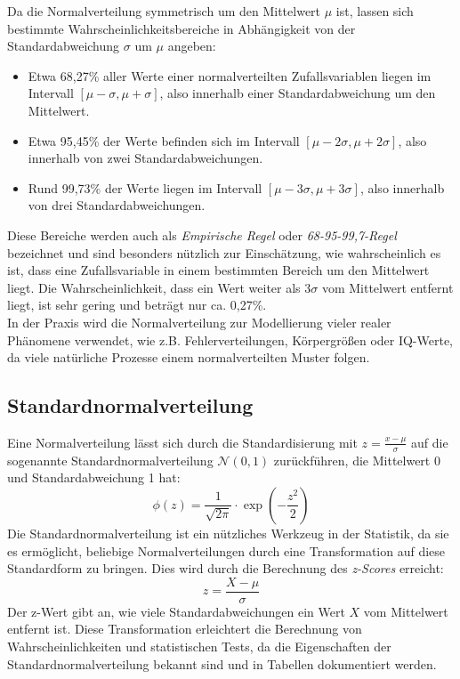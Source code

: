 Da die Normalverteilung symmetrisch um den Mittelwert $\mu$ ist, lassen sich bestimmte Wahrscheinlichkeitsbereiche in Abhängigkeit von der Standardabweichung $\sigma$ um $\mu$ angeben:

\begin{itemize}
    \item Etwa 68,27\% aller Werte einer normalverteilten Zufallsvariablen liegen im Intervall $[\mu - \sigma, \mu + \sigma]$, also innerhalb einer Standardabweichung um den Mittelwert.
    \item Etwa 95,45\% der Werte befinden sich im Intervall $[\mu - 2\sigma, \mu + 2\sigma]$, also innerhalb von zwei Standardabweichungen.
    \item Rund 99,73\% der Werte liegen im Intervall $[\mu - 3\sigma, \mu + 3\sigma]$, also innerhalb von drei Standardabweichungen.
\end{itemize}
Diese Bereiche werden auch als \textit{Empirische Regel} oder \textit{68-95-99,7-Regel} bezeichnet und sind besonders nützlich zur Einschätzung, wie wahrscheinlich es ist, dass eine Zufallsvariable in einem bestimmten Bereich um den Mittelwert liegt. Die Wahrscheinlichkeit, dass ein Wert weiter als $3\sigma$ vom Mittelwert entfernt liegt, ist sehr gering und beträgt nur ca. 0,27\%. \\
In der Praxis wird die Normalverteilung zur Modellierung vieler realer Phänomene verwendet, wie z.B. Fehlerverteilungen, Körpergrößen oder IQ-Werte, da viele natürliche
Prozesse einem normalverteilten Muster folgen.


\subsection{Standardnormalverteilung}
\label{sec:standard_normal_distribution}

Eine Normalverteilung lässt sich durch die Standardisierung mit $z = \frac{x - \mu}{\sigma}$ auf die sogenannte Standardnormalverteilung $\mathcal{N}(0, 1)$ zurückführen, die Mittelwert 0 und Standardabweichung 1 hat:
\[
\phi(z) = \frac{1}{\sqrt{2 \pi}} \cdot \exp\left(-\frac{z^2}{2}\right)
\]
Die Standardnormalverteilung ist ein nützliches Werkzeug in der Statistik, da sie es ermöglicht, beliebige Normalverteilungen durch eine Transformation auf diese Standardform zu bringen. Dies wird durch die Berechnung des \textit{z-Scores} erreicht:
\[
z = \frac{X - \mu}{\sigma}
\]
Der z-Wert gibt an, wie viele Standardabweichungen ein Wert \(X\) vom Mittelwert entfernt ist. Diese Transformation erleichtert die Berechnung von Wahrscheinlichkeiten und statistischen Tests, da die Eigenschaften der Standardnormalverteilung bekannt sind und in Tabellen dokumentiert werden.


